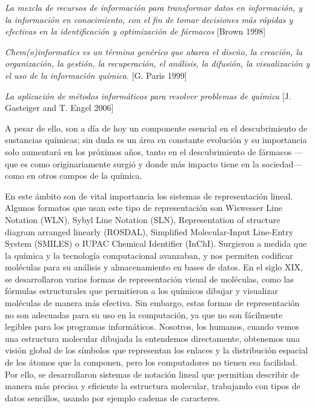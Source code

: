 \begin{center}
\small
\textit{La mezcla de recursos de información para transformar datos en información, y la información en conocimiento, con el fin de tomar decisiones más rápidas y efectivas en la identificación y optimización de fármacos} [Brown 1998]
\end{center}

\begin{center}
\small
\textit{Chem(o)informatics es un término genérico que abarca el diseño, la creación, la organización, la gestión, la recuperación, el análisis, la difusión, la visualización y el uso de la información química. }[G. Paris 1999]
\end{center}

\begin{center}
\small
\textit{La aplicación de métodos informáticos para resolver problemas de química} [J. Gasteiger and T. Engel 2006]
\end{center}


A pesar de ello, son a día de hoy un componente esencial en el descubrimiento de sustancias químicas; sin duda es un área en constante evolución y su importancia solo aumentará en los próximos años, tanto en el descubrimiento de fármacos —que es como originariamente surgió y donde más impacto tiene en la sociedad— como en otros campos de la química.


En este ámbito son de vital importancia los sistemas de representación lineal. Algunos formatos que usan este tipo de representación son Wiswesser Line Notation (WLN), Sybyl Line Notation (SLN), Representation of structure diagram arranged linearly (ROSDAL), Simplified Molecular-Input Line-Entry System (SMILES) o IUPAC Chemical Identifier (InChI). Surgieron a medida que la química y la tecnología computacional avanzaban, y nos permiten codificar moléculas para su análisis y almacenamiento en bases de datos. En el siglo XIX, se desarrollaron varias formas de representación visual de moléculas, como las fórmulas estructurales que permitieron a los químicos dibujar y visualizar moléculas de manera más efectiva. Sin embargo, estas formas de representación no son adecuadas para su uso en la computación, ya que no son fácilmente legibles para los programas informáticos. Nosotros, los humanos, cuando vemos una estructura molecular dibujada la entendemos directamente, obtenemos una visión global de los símbolos que representan los enlaces y la distribución espacial de los átomos que la componen, pero los computadores no tienen esa facilidad. Por ello, se desarrollaron sistemas de notación lineal que permitían describir de manera más precisa y eficiente la estructura molecular, trabajando con tipos de datos sencillos, usando por ejemplo cadenas de caracteres.

